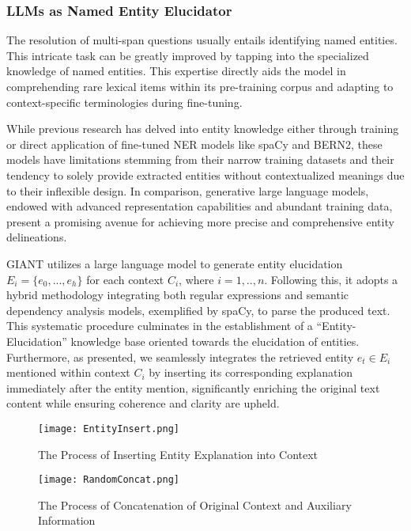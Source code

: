 \subsubsection{LLMs as Named Entity Elucidator}
 The resolution of multi-span questions usually entails identifying named entities. This intricate task can be greatly improved by tapping into the specialized knowledge of named entities. This expertise directly aids the model in comprehending rare lexical items within its pre-training corpus and adapting to context-specific terminologies during fine-tuning. 
  
 While previous research has delved into entity knowledge either through training or direct application of fine-tuned NER models like spaCy and BERN2, these models have limitations stemming from their narrow training datasets and their tendency to solely provide extracted entities without contextualized meanings due to their inflexible design.  
 In comparison, generative large language models, endowed with advanced representation capabilities and abundant training data, present a promising avenue for achieving more precise and comprehensive entity delineations.
  
 GIANT utilizes a large language model to generate entity elucidation $E_i = \{e_0,...,e_h\}$ for each context $C_i$, where $i=1,..,n$. 
 Following this, it adopts a hybrid methodology integrating both regular expressions and semantic dependency analysis models, exemplified by spaCy, to parse the produced text.
 This systematic procedure culminates in the establishment of a ``Entity-Elucidation'' knowledge base oriented towards the elucidation of entities. 
 Furthermore, as  presented, we seamlessly integrates the retrieved entity $e_t \in E_i$ mentioned within context $C_i$ by inserting its corresponding explanation immediately after the entity mention, significantly enriching the original text content while ensuring coherence and clarity are upheld.
 
\label{sec:LLMs as Named Entity Elucidator}
\begin{figure*}[h]
	\centering
	\texttt{[image: EntityInsert.png]}
	\caption{The Process of Inserting Entity Explanation into Context}
	\label{fig:entity_insertion}
\end{figure*}

\begin{figure*}[h]
	\centering
	\texttt{[image: RandomConcat.png]}
	\caption{The Process of Concatenation of Original Context and Auxiliary Information}
	\label{fig:random_concatenate}
\end{figure*}  

